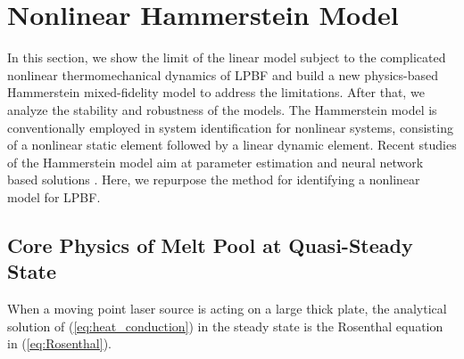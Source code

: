 \documentclass [11pt, proquest] {uwthesis}[2020/02/24]
\begin{document}
\section{\label{sec:HAMMERSTEIN-MODEL-IN}Nonlinear Hammerstein Model}

In this section, we show the limit of the linear model subject to
the complicated nonlinear thermomechanical dynamics of LPBF and build
a new physics-based Hammerstein mixed-fidelity model to address the limitations.
After that, we analyze the stability and robustness of the models.
The Hammerstein model is conventionally employed in system identification
for nonlinear systems, consisting of a nonlinear static element followed
by a linear dynamic element. Recent studies of the Hammerstein model
aim at parameter estimation and neural network based solutions
\cite{rayouf2019new,doyle2002identification,ren2011identification}. Here, we repurpose the method for identifying a nonlinear model for LPBF.

\subsection{\label{subsec:Analytical-Solutions}Core Physics of Melt Pool at
Quasi-Steady State}

When a moving point laser source is acting on a large thick plate,
the analytical solution of (\ref{eq:heat_conduction}) in the steady
state is the Rosenthal equation in (\ref{eq:Rosenthal}).
\end{document}
